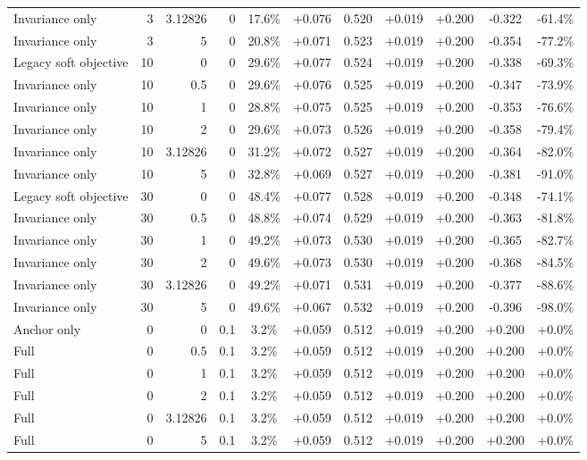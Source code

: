 \begin{table}[htbp]
\begin{tabular}{lrrrccccccc}
Invariance only & 3 & 3.12826 & 0 & 17.6\% & +0.076 & 0.520 & +0.019 & +0.200 & -0.322 & -61.4\% \\
Invariance only & 3 & 5 & 0 & 20.8\% & +0.071 & 0.523 & +0.019 & +0.200 & -0.354 & -77.2\% \\
Legacy soft objective & 10 & 0 & 0 & 29.6\% & +0.077 & 0.524 & +0.019 & +0.200 & -0.338 & -69.3\% \\
Invariance only & 10 & 0.5 & 0 & 29.6\% & +0.076 & 0.525 & +0.019 & +0.200 & -0.347 & -73.9\% \\
Invariance only & 10 & 1 & 0 & 28.8\% & +0.075 & 0.525 & +0.019 & +0.200 & -0.353 & -76.6\% \\
Invariance only & 10 & 2 & 0 & 29.6\% & +0.073 & 0.526 & +0.019 & +0.200 & -0.358 & -79.4\% \\
Invariance only & 10 & 3.12826 & 0 & 31.2\% & +0.072 & 0.527 & +0.019 & +0.200 & -0.364 & -82.0\% \\
Invariance only & 10 & 5 & 0 & 32.8\% & +0.069 & 0.527 & +0.019 & +0.200 & -0.381 & -91.0\% \\
Legacy soft objective & 30 & 0 & 0 & 48.4\% & +0.077 & 0.528 & +0.019 & +0.200 & -0.348 & -74.1\% \\
Invariance only & 30 & 0.5 & 0 & 48.8\% & +0.074 & 0.529 & +0.019 & +0.200 & -0.363 & -81.8\% \\
Invariance only & 30 & 1 & 0 & 49.2\% & +0.073 & 0.530 & +0.019 & +0.200 & -0.365 & -82.7\% \\
Invariance only & 30 & 2 & 0 & 49.6\% & +0.073 & 0.530 & +0.019 & +0.200 & -0.368 & -84.5\% \\
Invariance only & 30 & 3.12826 & 0 & 49.2\% & +0.071 & 0.531 & +0.019 & +0.200 & -0.377 & -88.6\% \\
Invariance only & 30 & 5 & 0 & 49.6\% & +0.067 & 0.532 & +0.019 & +0.200 & -0.396 & -98.0\% \\
Anchor only & 0 & 0 & 0.1 & 3.2\% & +0.059 & 0.512 & +0.019 & +0.200 & +0.200 & +0.0\% \\
Full & 0 & 0.5 & 0.1 & 3.2\% & +0.059 & 0.512 & +0.019 & +0.200 & +0.200 & +0.0\% \\
Full & 0 & 1 & 0.1 & 3.2\% & +0.059 & 0.512 & +0.019 & +0.200 & +0.200 & +0.0\% \\
Full & 0 & 2 & 0.1 & 3.2\% & +0.059 & 0.512 & +0.019 & +0.200 & +0.200 & +0.0\% \\
Full & 0 & 3.12826 & 0.1 & 3.2\% & +0.059 & 0.512 & +0.019 & +0.200 & +0.200 & +0.0\% \\
Full & 0 & 5 & 0.1 & 3.2\% & +0.059 & 0.512 & +0.019 & +0.200 & +0.200 & +0.0\% \\

\end{tabular}
\end{table}
